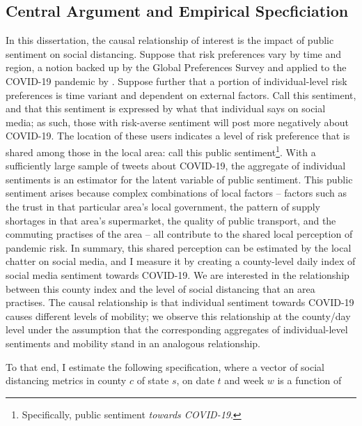 \documentclass[12pt,a4]{article}
\begin{document}
\subsection{Central Argument and Empirical Specficiation}
In this dissertation, the causal relationship of interest is the impact of public sentiment on social distancing. Suppose that risk preferences vary by time and region, a notion backed up by the Global Preferences Survey \parencite{falkGlobalEvidenceEconomic2018} and applied to the COVID-19 pandemic by \textcite{fanHeterogeneousActionsBeliefs2020}. Suppose further that a portion of individual-level risk preferences is time variant and dependent on external factors.  Call this sentiment, and that this sentiment is expressed by what that individual says on social media; as such, those with risk-averse sentiment will post more negatively about COVID-19. The location of these users indicates a level of risk preference that is shared among those in the local area: call this public sentiment\footnote{Specifically, public sentiment \textit{towards COVID-19}.}. With a sufficiently large sample of tweets about COVID-19, the aggregate of individual sentiments is an estimator for the latent variable of public sentiment. This public sentiment arises because complex combinations of local factors -- factors such as the trust in that particular area's local government, the pattern of supply shortages in that area's supermarket, the quality of public transport, and the commuting practises of the area -- all contribute to the shared local perception of pandemic risk. In summary, this shared perception can be estimated by the local chatter on social media, and I measure it by creating a county-level daily index of social media sentiment towards COVID-19. We are interested in the relationship between this county index and the level of social distancing that an area practises. The causal relationship is that individual sentiment towards COVID-19 causes different levels of mobility; we observe this relationship at the county/day level under the assumption that the corresponding aggregates of individual-level sentiments and mobility stand in an analogous relationship.

To that end, I estimate the following specification, where a vector of social distancing metrics in county \(c\) of state \(s\), on date \(t\) and week \(w\) is a function of
\end{document}
